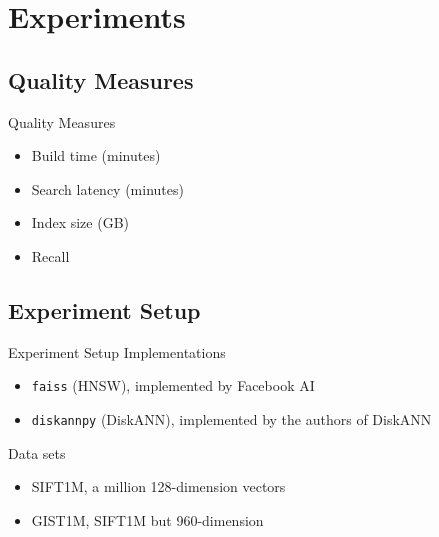 \section{Experiments}

\subsection{Quality Measures}

\begin{frame}{Quality Measures}
    \begin{itemize}
        \item Build time (minutes)
        \item Search latency (minutes)
        \item Index size (GB)
        \item Recall
    \end{itemize}
\end{frame}


\subsection{Experiment Setup}

\begin{frame}{Experiment Setup}
    Implementations
    \begin{itemize}
        \item \texttt{faiss} (HNSW), implemented by Facebook AI
        \item \texttt{diskannpy} (DiskANN), implemented by the authors of DiskANN
    \end{itemize}

    Data sets
    \begin{itemize}
        \item SIFT1M, a million 128-dimension vectors
        \item GIST1M, SIFT1M but 960-dimension
    \end{itemize}
\end{frame}

